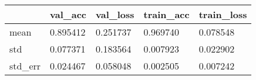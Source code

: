 \begin{tabular}{|l|l|l|l|l|}
\toprule \hline
 & val\_acc & val\_loss & train\_acc & train\_loss \\ \hline
\midrule
mean & 0.895412 & 0.251737 & 0.969740 & 0.078548 \\ \hline
std & 0.077371 & 0.183564 & 0.007923 & 0.022902 \\ \hline
std\_err & 0.024467 & 0.058048 & 0.002505 & 0.007242 \\ \hline
\bottomrule
\end{tabular}
